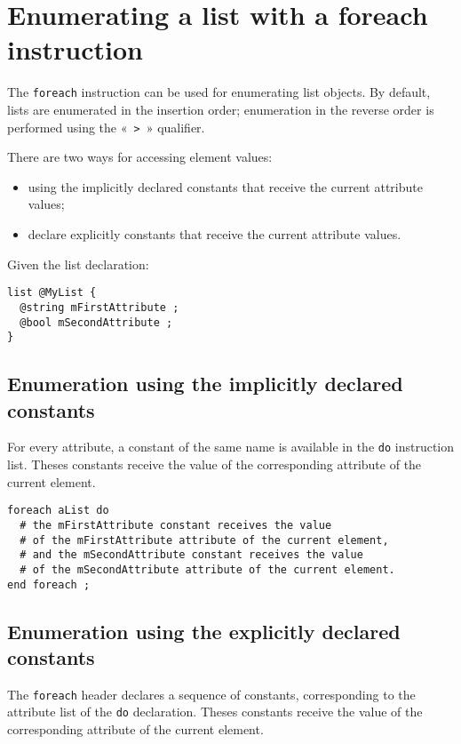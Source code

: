 \section{Enumerating a list with a foreach instruction}

The \lstinline[language=galgas]!foreach! instruction can be used for enumerating list objects. By default, lists are enumerated in the insertion order; enumeration in the reverse order is performed using the «~\lstinline[language=galgas]!>!~» qualifier.

There are two ways for accessing element values:
\begin{itemize}
\item using the implicitly declared constants that receive the current attribute values;
\item declare explicitly constants that receive the current attribute values.
\end{itemize}

Given the list declaration:

\begin{lstlisting}[language=galgas]
list @MyList {
  @string mFirstAttribute ;
  @bool mSecondAttribute ;
}
\end{lstlisting}

\subsection{Enumeration using the implicitly declared constants}

For every attribute, a constant of the same name is available in the \lstinline[language=galgas]!do! instruction list. Theses constants receive the value of the corresponding attribute of the current element.

\begin{lstlisting}[language=galgas]
foreach aList do
  # the mFirstAttribute constant receives the value
  # of the mFirstAttribute attribute of the current element,
  # and the mSecondAttribute constant receives the value
  # of the mSecondAttribute attribute of the current element.
end foreach ;
\end{lstlisting}

\subsection{Enumeration using the explicitly declared constants}

The \lstinline[language=galgas]!foreach! header declares a sequence of constants, corresponding to the attribute list of the \lstinline[language=galgas]!do! declaration. Theses constants receive the value of the corresponding attribute of the current element.


